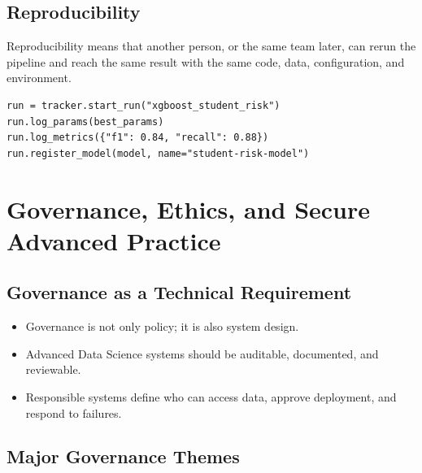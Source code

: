 \documentclass[11pt,a4paper]{article}
\begin{document}
\subsection{Reproducibility}

\begin{conceptbox}[Reproducibility]
Reproducibility means that another person, or the same team later, can rerun the pipeline and reach the same result with the same code, data, configuration, and environment.
\end{conceptbox}

\begin{lstlisting}
run = tracker.start_run("xgboost_student_risk")
run.log_params(best_params)
run.log_metrics({"f1": 0.84, "recall": 0.88})
run.register_model(model, name="student-risk-model")
\end{lstlisting}

\section{Governance, Ethics, and Secure Advanced Practice}

\subsection{Governance as a Technical Requirement}

\begin{itemize}[leftmargin=*]
  \item Governance is not only policy; it is also system design.
  \item Advanced Data Science systems should be auditable, documented, and reviewable.
  \item Responsible systems define who can access data, approve deployment, and respond to failures.
\end{itemize}

\subsection{Major Governance Themes}
\end{document}
